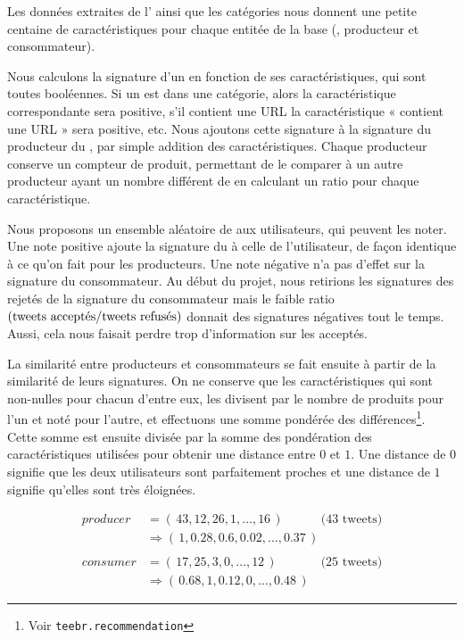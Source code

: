 Les données extraites de l’\api{} ainsi que les catégories nous donnent une
petite centaine de caractéristiques pour chaque entitée de la base (\tweet{},
producteur et consommateur).

Nous calculons la signature d’un \tweet{} en fonction de ses caractéristiques,
qui sont toutes booléennes. Si un \tweet{} est dans une catégorie, alors la
caractéristique correspondante sera positive, s’il contient une URL la
caractéristique « contient une URL » sera positive, etc. Nous ajoutons cette
signature à la signature du producteur du \tweet{}, par simple addition des
caractéristiques. Chaque producteur conserve un compteur de \tweets{} produit,
permettant de le comparer à un autre producteur ayant un nombre différent de
\tweets{} en calculant un ratio pour chaque caractéristique.

Nous proposons un ensemble aléatoire de \tweets{} aux utilisateurs, qui peuvent
les noter. Une note positive ajoute la signature du \tweet{} à celle de
l’utilisateur, de façon identique à ce qu’on fait pour les producteurs. Une
note négative n’a pas d’effet sur la signature du consommateur. Au début du
projet, nous retirions les signatures des \tweets{} rejetés de la signature du
consommateur mais le faible ratio
$(\text{tweets{} acceptés} / \text{tweets{} refusés})$ donnait des signatures
négatives tout le temps. Aussi, cela nous faisait perdre trop d’information sur
les \tweets{} acceptés.

La similarité entre producteurs et consommateurs se fait ensuite à partir de la
similarité de leurs signatures. On ne conserve que les caractéristiques qui
sont non-nulles pour chacun d’entre eux, les divisent par le nombre de
\tweets{} produits pour l’un et noté pour l’autre, et effectuons une somme
pondérée des différences\footnote{Voir \verb|teebr.recommendation|}. Cette
somme est ensuite divisée par la somme des pondération des caractéristiques
utilisées pour obtenir une distance entre $0$ et $1$. Une distance de $0$
signifie que les deux utilisateurs sont parfaitement proches et une distance
de $1$ signifie qu’elles sont très éloignées.

\begin{equation}
  \label{eq:sig_proc_cons}
  \begin{split}
    producer &= (\,43, 12, 26, 1, \ldots, 16\,)\quad\qquad\text{(43 tweets)} \\
             &\Rightarrow (\,1, 0.28, 0.6, 0.02, \ldots, 0.37\,) \\
    \\
    consumer &= (\,17, 25, 3, 0, \ldots, 12\,)\,\,\,\quad\qquad\text{(25 tweets)} \\
             &\Rightarrow (\,0.68, 1, 0.12, 0, \ldots, 0.48\,)
  \end{split}
\end{equation}


